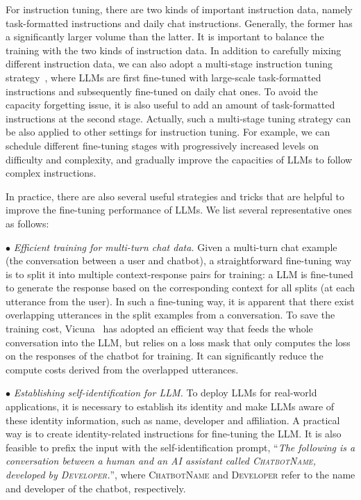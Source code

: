 For instruction tuning, there are two kinds of important instruction data, namely task-formatted instructions and daily chat instructions. 
Generally, the former has a significantly larger volume than the latter. 
It is important to balance the training with the two kinds of  instruction data. In addition to carefully mixing different instruction data, we can also adopt a multi-stage instruction tuning strategy~\cite{YuLan-Chat}, where LLMs are first fine-tuned with large-scale task-formatted instructions and subsequently fine-tuned on daily chat ones.
To avoid the capacity forgetting issue, it is also useful to add an amount of  task-formatted instructions at the second stage. 
Actually, such a multi-stage tuning strategy can be also applied to other settings for instruction tuning. For example, we can schedule different fine-tuning stages with progressively increased  levels on difficulty and complexity, and gradually improve the capacities of LLMs to follow complex instructions.

%

{In practice, there are also several useful strategies and tricks that are helpful to improve the fine-tuning performance of LLMs. We  list several  representative ones as follows:}

$\bullet$ \emph{Efficient training for multi-turn chat data.}
Given a multi-turn chat example (the conversation between a user and chatbot), a straightforward fine-tuning way is to split it into multiple context-response pairs for training: a LLM is fine-tuned to generate the response based on the corresponding context for all splits (\ie at each utterance from the user). In such a fine-tuning way, it is apparent that there exist  overlapping utterances in the split examples from a conversation. 
To save the training cost, Vicuna~\cite{vicuna2023} has adopted an efficient way that feeds the whole conversation into the LLM, but relies on a loss mask that only computes the loss on the responses of the chatbot for training.
It can significantly reduce the compute costs derived from the overlapped utterances.



$\bullet$ \emph{Establishing self-identification for LLM.}
To deploy  LLMs for real-world applications, it is necessary to establish its identity and make LLMs aware of these identity information, such as name, developer and affiliation. 
A practical  way is to create identity-related instructions for fine-tuning the LLM. It is also feasible to prefix the input with the self-identification prompt, \eg ``\emph{The following is a conversation between a human and an AI assistant called \textsc{ChatbotName}, developed by \textsc{Developer}.}'', where \textsc{ChatbotName} and \textsc{Developer} refer to the name and developer of the chatbot, respectively.

